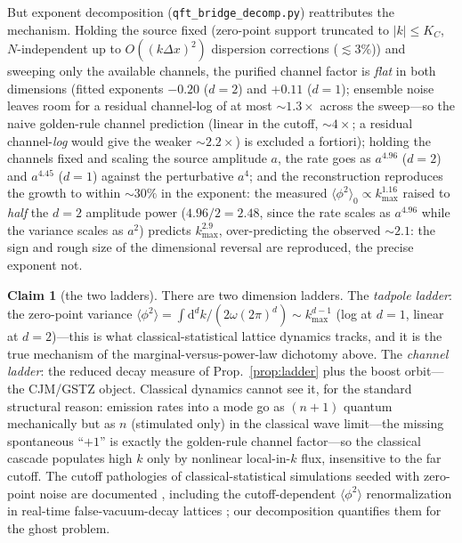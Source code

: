 \documentclass[11pt]{article}
\theoremstyle{definition}
\newtheorem{claim}[theorem]{Claim}
\theoremstyle{remark}
\newcommand{\dd}{\mathrm{d}}
\newcommand{\avg}[1]{\langle #1 \rangle}
\begin{document}
But exponent decomposition (\texttt{qft\_bridge\_decomp.py})
reattributes the mechanism. Holding the source fixed (zero-point
support truncated to $|k|\le K_C$, $N$-independent up to
$O((k\Delta x)^2)$ dispersion corrections (${\lesssim}3\%$)) and
sweeping only the available channels, the purified channel factor is
\emph{flat} in both dimensions (fitted exponents $-0.20$ ($d{=}2$) and
$+0.11$ ($d{=}1$); ensemble noise leaves room for a residual channel-log of at
most ${\sim}1.3\times$ across the sweep---so the naive golden-rule channel prediction (linear in the
cutoff, ${\sim}4\times$; a residual channel-\emph{log} would give the weaker
${\sim}2.2\times$) is excluded a fortiori); holding the channels fixed and scaling the source amplitude
$a$, the rate goes as $a^{4.96}$ ($d{=}2$) and $a^{4.45}$ ($d{=}1$) against the
perturbative $a^{4}$; and the reconstruction reproduces the growth to within ${\sim}30\%$ in the exponent: the measured
$\avg{\phi^{2}}_0\propto k_{\max}^{1.16}$ raised to \emph{half} the
$d{=}2$ amplitude power ($4.96/2=2.48$, since the rate scales as
$a^{4.96}$ while the variance scales as $a^{2}$) predicts
$k_{\max}^{2.9}$, over-predicting the observed ${\sim}2.1$: the sign and
rough size of the dimensional reversal are reproduced, the precise exponent
not.

\begin{claim}[the two ladders]
\label{claim:twoladders}
There are two dimension ladders. The \emph{tadpole ladder}: the
zero-point variance $\avg{\phi^{2}}=\int\dd^{d}k/(2\omega(2\pi)^d)
\sim k_{\max}^{d-1}$ (log at $d{=}1$, linear at $d{=}2$)---this is
what classical-statistical lattice dynamics tracks, and it is the
true mechanism of the marginal-versus-power-law dichotomy above. The
\emph{channel ladder}: the reduced decay measure of
Prop.~\ref{prop:ladder} plus the boost orbit---the CJM/GSTZ object.
Classical dynamics cannot see it, for the standard structural
reason: emission rates into a mode go as $(n+1)$ quantum
mechanically but as $n$ (stimulated only) in the classical wave
limit---the missing spontaneous ``$+1$'' is exactly the golden-rule
channel factor---so the classical cascade populates high $k$ only by
nonlinear local-in-$k$ flux, insensitive to the far cutoff. The
cutoff pathologies of classical-statistical simulations seeded with
zero-point noise are documented \cite{EGW2014}, including the
cutoff-dependent $\avg{\phi^2}$ renormalization in real-time
false-vacuum-decay lattices \cite{LatticeFVD2022}; our decomposition
quantifies them for the ghost problem.
\end{claim}
\end{document}
